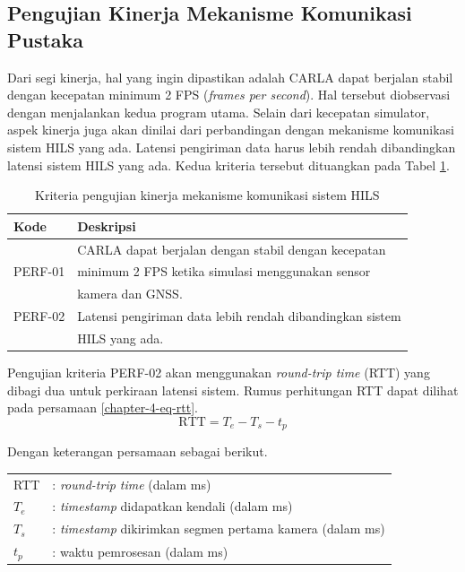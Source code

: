 \subsection{Pengujian Kinerja Mekanisme Komunikasi Pustaka}

Dari segi kinerja, hal yang ingin dipastikan adalah CARLA dapat berjalan stabil
dengan kecepatan minimum 2 FPS (\textit{frames per second}). Hal tersebut
diobservasi dengan menjalankan kedua program utama. Selain dari kecepatan
simulator, aspek kinerja juga akan dinilai dari perbandingan dengan mekanisme
komunikasi sistem HILS yang ada. Latensi pengiriman data harus lebih rendah
dibandingkan latensi sistem HILS yang ada. Kedua kriteria tersebut dituangkan
pada Tabel
\ref{chapter-4-tbl-perf-criteria}.
\begin{table}[!htbp]
	\begin{center}
		\begin{tabular}{|l|l|}
			\hline
			\textbf{Kode} & \textbf{Deskripsi}                                       \\
			\hline
			              & CARLA dapat berjalan dengan stabil dengan kecepatan      \\
			PERF-01       & minimum 2 FPS ketika simulasi menggunakan sensor         \\
			              & kamera dan GNSS.                                         \\
			\hline
			PERF-02       & Latensi pengiriman data lebih rendah dibandingkan sistem \\
			              & HILS yang ada.                                           \\
			\hline
		\end{tabular}
	\end{center}
	\caption{Kriteria pengujian kinerja mekanisme komunikasi sistem HILS}
	\label{chapter-4-tbl-perf-criteria}
\end{table}

Pengujian kriteria PERF-02 akan menggunakan \textit{round-trip time} (RTT) yang
dibagi dua untuk perkiraan latensi sistem. Rumus perhitungan RTT dapat dilihat
pada persamaan \ref{chapter-4-eq-rtt}.
\begin{equation}
	\label{chapter-4-eq-rtt}
	\text{RTT} = T_{e} - T_{s} - t_p
\end{equation}

Dengan keterangan persamaan sebagai berikut.
\begin{table}[!h]
	\begin{tabular}{l l}
		RTT     & :     \textit{round-trip time} (dalam ms)             \\
		$T_{e}$ & : \textit{timestamp} didapatkan kendali (dalam ms)    \\
		$T_{s}$ & : \textit{timestamp} dikirimkan segmen pertama kamera
		(dalam ms)                                                      \\
		$t_p$   & :   waktu pemrosesan (dalam ms)
	\end{tabular}
\end{table}

